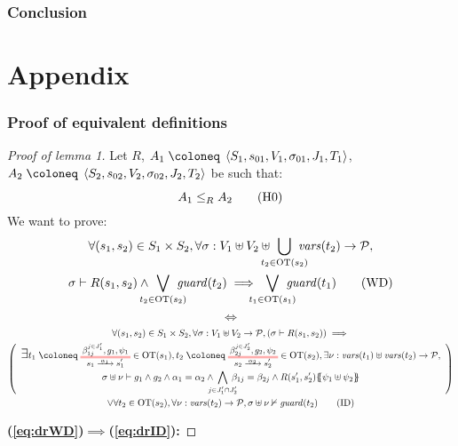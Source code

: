 \documentclass{article}
\begin{document}
\section{Conclusion}

\pagebreak



\pagebreak
\appendix
\part*{Appendix}

\section{Proof of equivalent definitions}\label{apx:lemeqd}
\begin{proof}[Proof of lemma 1]
Let \(R\), \(A_1 \defobject \OA{S_1}{s_{01}}{V_1}{\sigma_{01}}{J_1}{T_1}\), \(A_2 \defobject \OA{S_2}{s_{02}}{V_2}{\sigma_{02}}{J_2}{T_2}\) be such that:
\[ \wrel{A_1}{A_2}{R} \hyp{0} \]
We want to prove:
\begin{multline}
	\forall \mpar{s_1, s_2} \in S_1 \times S_2, \forall \sigma: V_1 \uplus V_2 \uplus \bigcup_\subbox{t_2 \in \fOT{s_2}} \fvars{t_2} \to \values, \\
	\sigma \vdash R\mpar{s_1, s_2} \wedge \bigvee_\subbox{t_2 \in \fOT{s_2}} \fguard{t_2} \implies \bigvee_\subbox{t_1 \in \fOT{s_1}} \fguard{t_1} \tag{WD}\label{eq:drWD}
\end{multline}
\[ \iff \]
\begin{multline}
	\forall \mpar{s_1, s_2} \in S_1 \times S_2, \forall \sigma: V_1 \uplus V_2 \to \values, \mpar{\sigma \vdash R\mpar{s_1, s_2}} \implies \\
	\mpar{\everymath{\displaystyle}\begin{array}{c}
		\bigsymb{\exists} t_1 \defobject \OTx{1}{}{1}{1} \in \fOT{s_1}, t_2 \defobject \OTx{2}{}{2}{2} \in \fOT{s_2}, \exists \nu: \fvars{t_1} \uplus \fvars{t_2} \to \values, \\
		\sigma \uplus \nu \vdash g_1 \wedge g_2 \wedge \alpha_1 = \alpha_2 \wedge \bigwedge_\subbox{j \in J'_1 \cap J'_2} \beta_{1j} = \beta_{2j} \wedge R\mpar{s'_1, s'_2}\psubst{\psi_1 \uplus \psi_2}
	\end{array}} \\
	\vee \forall t_2 \in \fOT{s_2}, \forall \nu: \fvars{t_2} \to \values, \sigma \uplus \nu \nvdash \fguard{t_2} \tag{ID}\label{eq:drID}
\end{multline}
\item[\bf(\ref{eq:drWD})\(\implies\)(\ref{eq:drID}):]

\end{proof}
\end{document}

